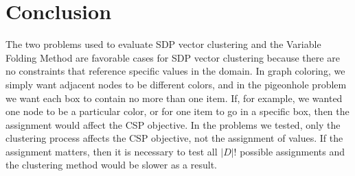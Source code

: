 \documentclass[12pt]{article} %
\begin{document}
\section{Conclusion}

The two problems used to evaluate SDP vector clustering and the Variable Folding Method are favorable cases for SDP vector clustering because there are no constraints that reference specific values in the domain. In graph coloring, we simply want adjacent nodes to be different colors, and in the pigeonhole problem we want each box to contain no more than one item. If, for example, we wanted one node to be a particular color, or for one item to go in a specific box, then the assignment would affect the CSP objective. In the problems we tested, only the clustering process affects the CSP objective, not the assignment of values. If the assignment matters, then it is necessary to test all $|D|!$ possible assignments and the clustering method would be slower as a result.

\renewcommand{\bibname}{References}


\end{document}
